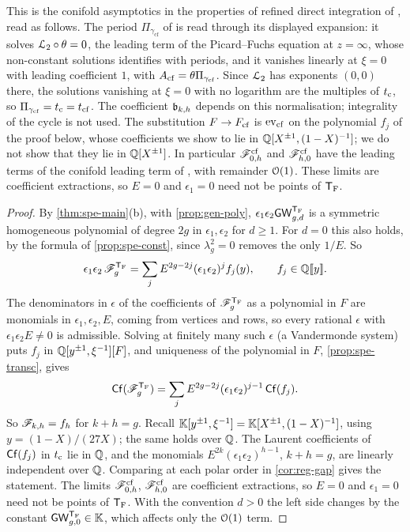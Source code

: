 This is the conifold asymptotics in the properties of refined direct integration of \cite{BS}, read as follows.  The period $\Pi_{\gamma_{\mathrm{cf}}}$ of \cite{BS} is read through its displayed expansion: it solves $\mathcal{L}_{2}\circ\theta=0$, the leading term of the Picard--Fuchs equation at $z=\infty$, whose non-constant solutions \cite{BS} identifies with periods, and it vanishes linearly at $\xi=0$ with leading coefficient $1$, with $A_{\mathrm{cf}}=\theta\Pi_{\gamma_{\mathrm{cf}}}$. Since $\mathcal{L}_{2}$ has exponents $(0,0)$ there, the solutions vanishing at $\xi=0$ with no logarithm are the multiples of $t_{\mathrm{c}}$, so $\Pi_{\gamma_{\mathrm{cf}}}=t_{\mathrm{c}}=t_{\mathrm{cf}}$. The coefficient $\mathfrak{b}_{k,h}$ depends on this normalisation; integrality of the cycle is not used. The substitution $F\to F_{\mathrm{cf}}$ is $\mathrm{ev}_{\mathrm{cf}}$ on the polynomial $f_j$ of the proof below, whose coefficients we show to lie in $\mathbb{Q}[X^{\pm1},(1-X)^{-1}]$; we do not show that they lie in $\mathbb{Q}[X^{\pm1}]$. In particular $\mathscr{F}^{\mathrm{cf}}_{0,h}$ and $\mathscr{F}^{\mathrm{cf}}_{h,0}$ have the leading terms of the conifold leading term of \cite{BS}, with remainder $\mathcal{O}(1)$. These limits are coefficient extractions, so $E=0$ and $\epsilon_1=0$ need not be points of $\mathsf{T}_{\mathrm{F}}$.

\begin{proof}
By \cref{thm:spe-main}(b), with \cref{prop:gen-poly}, $\epsilon_1\epsilon_2\mathsf{GW}_{g,d}^{\mathsf{T}_{\mathrm{F}}}$ is a symmetric homogeneous polynomial of degree $2g$ in $\epsilon_1,\epsilon_2$ for $d\geq 1$. For $d=0$ this also holds, by the formula of \cref{prop:spe-const}, since $\lambda_g^2=0$ removes the only $1/E$. So
\[
\epsilon_1\epsilon_2\,\mathscr{F}_g^{\mathsf{T}_{\mathrm{F}}}=\sum_jE^{2g-2j}(\epsilon_1\epsilon_2)^j f_j(y),\qquad f_j\in\mathbb{Q}[\![ y ]\!].
\]
The denominators in $\epsilon$ of the coefficients of $\mathscr{F}_g^{\mathsf{T}_{\mathrm{F}}}$ as a polynomial in $F$ are monomials in $\epsilon_1,\epsilon_2,E$, coming from vertices and rows, so every rational $\epsilon$ with $\epsilon_1\epsilon_2E\neq 0$ is admissible. Solving at finitely many such $\epsilon$ (a Vandermonde system) puts $f_j$ in $\mathbb{Q}[y^{\pm1},\xi^{-1}][F]$, and uniqueness of the polynomial in $F$, \cref{prop:spe-transc}, gives
\[
\mathsf{Cf}(\mathscr{F}_g^{\mathsf{T}_{\mathrm{F}}})=\sum_jE^{2g-2j}(\epsilon_1\epsilon_2)^{j-1}\,\mathsf{Cf}(f_j).
\]
So $\mathscr{F}_{k,h}=f_h$ for $k+h=g$. Recall $\mathbb{K}[y^{\pm1},\xi^{-1}]=\mathbb{K}[X^{\pm1},(1-X)^{-1}]$, using $y=(1-X)/(27X)$; the same holds over $\mathbb{Q}$. The Laurent coefficients of $\mathsf{Cf}(f_j)$ in $t_{\mathrm{c}}$ lie in $\mathbb{Q}$, and the monomials $E^{2k}(\epsilon_1\epsilon_2)^{h-1}$, $k+h=g$, are linearly independent over $\mathbb{Q}$. Comparing at each polar order in \cref{cor:reg-gap} gives the statement. The limits $\mathscr{F}^{\mathrm{cf}}_{0,h}$, $\mathscr{F}^{\mathrm{cf}}_{h,0}$ are coefficient extractions, so $E=0$ and $\epsilon_1=0$ need not be points of $\mathsf{T}_{\mathrm{F}}$. With the convention $d>0$ the left side changes by the constant $\mathsf{GW}_{g,0}^{\mathsf{T}_{\mathrm{F}}}\in\mathbb{K}$, which affects only the $\mathcal{O}(1)$ term.
\end{proof}

